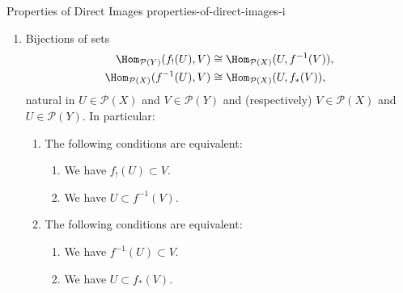 \begin{proposition}{Properties of Direct Images \rmI}{properties-of-direct-images-i}
\begin{enumerate}
\begin{enumerate}
\[\begin{gathered}
                            f_{!}(f^{-1}(V)) \subset V,
                        \end{gathered}
                        \qquad
                        \begin{gathered}
                            V                \subset f_{*}(f^{-1}(V)),\\
                            f^{-1}(f_{*}(U)) \subset U
                        \end{gathered}
                    \]%
                    indexed by $U\in\mathcal{P}(X)$ and $V\in\mathcal{P}(Y)$.
                \item\label{properties-of-direct-images-i-triple-adjointness-2}Bijections of sets
                    \begin{align*}
                        \Hom_{\mathcal{P}(Y)}(f_{!}(U),V)  &\cong \Hom_{\mathcal{P}(X)}(U,f^{-1}(V)),\\
                        \Hom_{\mathcal{P}(X)}(f^{-1}(U),V) &\cong \Hom_{\mathcal{P}(X)}(U,f_{*}(V)),
                    \end{align*}
                    natural in $U\in\mathcal{P}(X)$ and $V\in\mathcal{P}(Y)$ and (respectively) $V\in\mathcal{P}(X)$ and $U\in\mathcal{P}(Y)$. In particular:
                    \begin{enumerate}
                        \item\label{properties-of-direct-images-i-triple-adjointness-2-a}The following conditions are equivalent:
                            \begin{enumerate}
                                \item\label{properties-of-direct-images-i-triple-adjointness-2-a-i}We have $f_{!}(U)\subset V$.
                                \item\label{properties-of-direct-images-i-triple-adjointness-2-a-ii}We have $U\subset f^{-1}(V)$.
                            \end{enumerate}
                        \item\label{properties-of-direct-images-i-triple-adjointness-2-b}The following conditions are equivalent:
                            \begin{enumerate}
                                \item\label{properties-of-direct-images-i-triple-adjointness-2-b-i}We have $f^{-1}(U)\subset V$.
                                \item\label{properties-of-direct-images-i-triple-adjointness-2-b-ii}We have $U\subset f_{*}(V)$.

\end{enumerate}
\end{enumerate}
\end{enumerate}
\end{enumerate}
\end{proposition}
